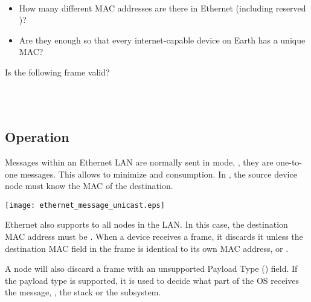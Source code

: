 \begin{exercise}\ \\[-0.5cm]
\begin{itemize}
\item How many different MAC addresses are there in Ethernet (including reserved )?
\item Are they enough so that every internet-capable device on Earth has a unique MAC?
\end{itemize}
\end{exercise}

\begin{exercise} 
Is the following frame valid?
% 
\begin{center}
\\
\\
\end{center}
\end{exercise}


\subsection*{Operation}

Messages within an Ethernet LAN are normally sent in  mode, \ie, they are one-to-one messages.
This allows  to minimize  and  consumption.
% 
In , the source device node must know the MAC of the destination.
% 
\begin{center}
\texttt{[image: ethernet\_message\_unicast.eps]}
\end{center}

Ethernet also supports  to all nodes in the LAN. In this case, the destination
MAC address must be .
% 
When a device receives a frame, it discards it unless the destination MAC field in the frame
is identical to its own MAC address, or . 

A node will also discard a frame with an unsupported Payload Type () field. 
% 
If the payload type is supported, it is used to decide what part of the OS receives the message,
\eg, the  stack or the  subsystem.

